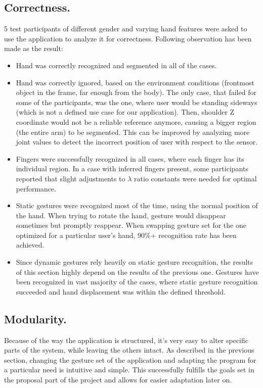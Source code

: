 \documentclass[a4paper,11pt,oneside]{article}
\begin{document}
\subsection{Correctness.}
5 test participants of different gender and varying hand features were asked to use the application to analyze it for correctness. Following observation has been made as the result:\\

\begin{itemize}
\item Hand was correctly recognized and segmented in all of the cases.
\item Hand was correctly ignored, based on the environment conditions (frontmost object in the frame, far enough from the body). The only case, that failed for some of the participants, was the one, where user would be standing sideways (which is not a defined use case for our application). Then, shoulder Z coordinate would not be a reliable reference anymore, causing a bigger region (the entire arm) to be segmented. This can be improved by analyzing more joint values to detect the incorrect position of user with respect to the sensor.
\item Fingers were successfully recognized in all cases, where each finger has its individual region. In a case with inferred fingers present, some participants reported that slight adjustments to $\lambda$ ratio constants were needed for optimal performance.
\item Static gestures were recognized most of the time, using the normal position of the hand. When trying to rotate the hand, gesture would disappear sometimes but promptly reappear. When swapping gesture set for the one optimized for a particular user's hand, 90\%+ recognition rate has been achieved.
\item Since dynamic gestures rely heavily on static gesture recognition, the results of this section highly depend on the results of the previous one. Gestures have been recognized in vast majority of the cases, where static gesture recognition succeeded and hand displacement was within the defined threshold. 
\end{itemize}

\subsection{Modularity.}
Because of the way the application is structured, it's very easy to alter specific parts of the system, while leaving the others intact. As described in the previous section, changing the gesture set of the application and adapting the program for a particular need is intuitive and simple. This successfully fulfills the goals set in the proposal part of the project and allows for easier adaptation later on.
\end{document}
